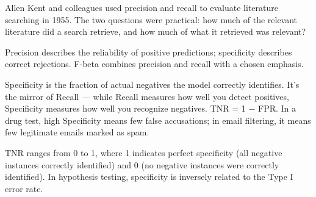 
{
    Allen Kent and colleagues used precision and recall to evaluate literature searching in 1955. The two questions were practical: how much of the relevant literature did a search retrieve, and how much of what it retrieved was relevant?
}

\metricsecondary

Precision describes the reliability of positive predictions; specificity describes correct rejections. F-beta combines precision and recall with a chosen emphasis.

\metricend
\clearpage
\thispagestyle{classificationstyle}
\label{sec:tnr-specificity}

Specificity is the fraction of actual negatives the model correctly identifies. It's the mirror of Recall —
while Recall measures how well you detect positives, Specificity measures how well you recognize negatives. TNR = 1 $-$ FPR.
In a drug test, high Specificity means few false accusations; in email filtering, it means few legitimate emails marked as spam.

\begin{metricformula}
\end{metricformula}

TNR ranges from 0 to 1, where 1 indicates perfect specificity (all negative instances correctly identified) and 0 (no negative instances were correctly identified).
In hypothesis testing, specificity is inversely related to the Type I error rate.

